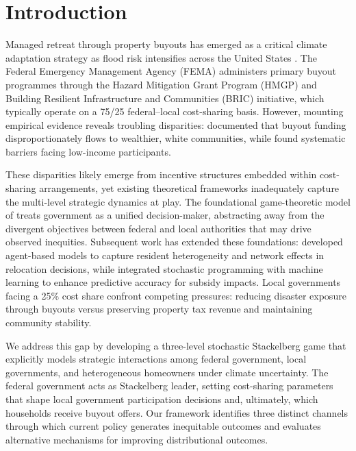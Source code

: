 \documentclass[12pt,a4paper]{article}
\begin{document}
\section{Introduction}\label{sec:intro}

Managed retreat through property buyouts has emerged as a critical climate adaptation strategy as flood risk intensifies across the United States \citep{siders2019strategic, mach2019managed}. The Federal Emergency Management Agency (FEMA) administers primary buyout programmes through the Hazard Mitigation Grant Program (HMGP) and Building Resilient Infrastructure and Communities (BRIC) initiative, which typically operate on a 75/25 federal--local cost-sharing basis. However, mounting empirical evidence reveals troubling disparities: \citet{elliott2021racial} documented that buyout funding disproportionately flows to wealthier, white communities, while \citet{greer2017historical} found systematic barriers facing low-income participants.

These disparities likely emerge from incentive structures embedded within cost-sharing arrangements, yet existing theoretical frameworks inadequately capture the multi-level strategic dynamics at play. The foundational game-theoretic model of \citet{bier2019game} treats government as a unified decision-maker, abstracting away from the divergent objectives between federal and local authorities that may drive observed inequities. Subsequent work has extended these foundations: \citet{zhou2022predisaster} developed agent-based models to capture resident heterogeneity and network effects in relocation decisions, while \citet{zhou2025stochastic} integrated stochastic programming with machine learning to enhance predictive accuracy for subsidy impacts. Local governments facing a 25\% cost share confront competing pressures: reducing disaster exposure through buyouts versus preserving property tax revenue and maintaining community stability.

We address this gap by developing a three-level stochastic Stackelberg game that explicitly models strategic interactions among federal government, local governments, and heterogeneous homeowners under climate uncertainty. The federal government acts as Stackelberg leader, setting cost-sharing parameters that shape local government participation decisions and, ultimately, which households receive buyout offers. Our framework identifies three distinct channels through which current policy generates inequitable outcomes and evaluates alternative mechanisms for improving distributional outcomes.
\end{document}
